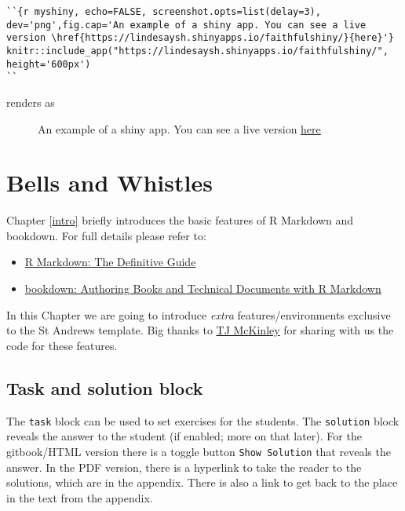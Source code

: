 \documentclass[
  oneside]{krantz}
\providecommand{\tightlist}{%
  \setlength{\itemsep}{0pt}\setlength{\parskip}{0pt}}
\theoremstyle{definition}
\theoremstyle{definition}
\theoremstyle{definition}
\theoremstyle{remark}
\begin{document}
\begin{verbatim}
``{r myshiny, echo=FALSE, screenshot.opts=list(delay=3), dev='png',fig.cap='An example of a shiny app. You can see a live version \href{https://lindesaysh.shinyapps.io/faithfulshiny/}{here}'}
knitr::include_app("https://lindesaysh.shinyapps.io/faithfulshiny/", height='600px')
``
\end{verbatim}

renders as



\begin{figure}

\label{fig:myshiny}An example of a shiny app. You can see a live version \href{https://lindesaysh.shinyapps.io/faithfulshiny/}{here}

\end{figure}

\hypertarget{bellsandwhistles}{%
\chapter{Bells and Whistles}\label{bellsandwhistles}}

Chapter \ref{intro} briefly introduces the basic features of R Markdown and bookdown. For full details please refer to:

\begin{itemize}
\tightlist
\item
  \href{https://bookdown.org/yihui/rmarkdown/}{R Markdown: The Definitive Guide}
\item
  \href{https://bookdown.org/yihui/bookdown/}{bookdown: Authoring Books and Technical Documents with R Markdown}
\end{itemize}

In this Chapter we are going to introduce \emph{extra} features/environments exclusive to the St Andrews template. Big thanks to \href{https://github.com/tjmckinley/RtutorialSkeleton}{TJ McKinley} for sharing with us the code for these features.

\hypertarget{task-and-solution-block}{%
\section{Task and solution block}\label{task-and-solution-block}}

The \texttt{task} block can be used to set exercises for the students. The \texttt{solution} block reveals the answer to the student (if enabled; more on that later). For the gitbook/HTML version
there is a toggle button \texttt{Show\ Solution} that reveals the answer. In the PDF version, there is a hyperlink to take the reader to the solutions, which are in the appendix. There is also a link to get back to the place in the text from the appendix.
\end{document}
